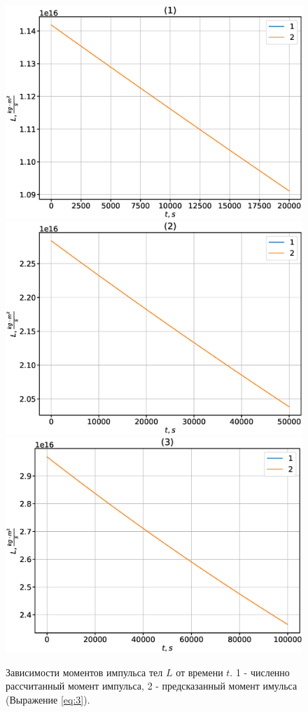\documentclass[12pt]{article}
\begin{document}
\begin{figure}[H]
      \includegraphics[width=1.0\linewidth]{L_t_1.eps}
    \endminipage\hfill
      \includegraphics[width=1.0\linewidth]{L_t_2.eps}
    \endminipage\hfill
      \includegraphics[width=1.0\linewidth]{L_t_3.eps}
    \endminipage
    \caption{Зависимости моментов импульса тел $L$ от времени $t$. 1 - численно рассчитанный момент импульса, 
    2 - предсказанный момент имульса (Выражение \ref{eq:3}).}
    \label{fig:4}
    \end{figure}
\end{document}
